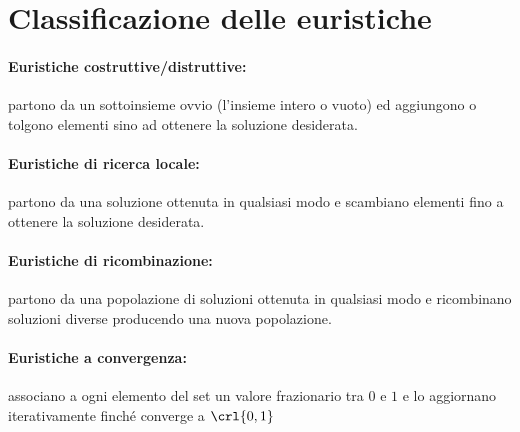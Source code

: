 \documentclass[\main/main.tex]{subfiles}
\begin{document}
\section{Classificazione delle euristiche}
\begin{multicols}{2}
  \paragraph*{Euristiche costruttive/distruttive:} partono da un sottoinsieme ovvio (l'insieme intero o vuoto) ed aggiungono o tolgono elementi sino ad ottenere la soluzione desiderata.
  \paragraph*{Euristiche di ricerca locale:} partono da una soluzione ottenuta in qualsiasi modo e scambiano elementi fino a ottenere la soluzione desiderata.
  \paragraph*{Euristiche di ricombinazione:} partono da una popolazione di soluzioni ottenuta in qualsiasi modo e ricombinano soluzioni diverse producendo una nuova popolazione.
  \paragraph*{Euristiche a convergenza:} associano a ogni elemento del set un valore frazionario tra \(0\) e \(1\) e lo aggiornano iterativamente finché converge a \(\crl{0, 1}\)
\end{multicols}
\end{document}
